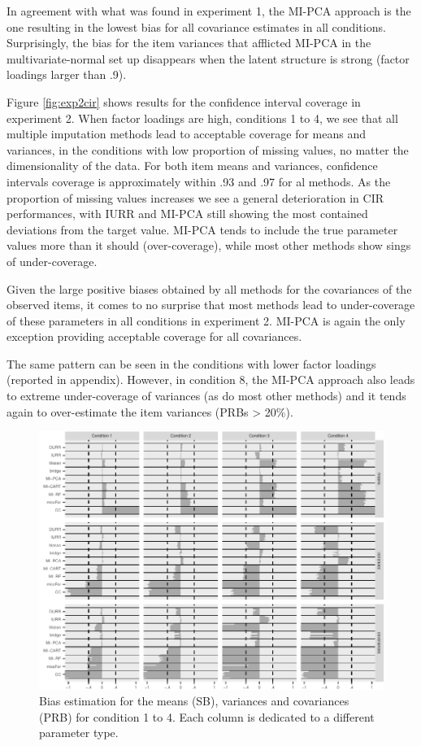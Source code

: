 	In agreement with what was found in experiment 1, the MI-PCA approach is the one resulting in the lowest
	bias for all covariance estimates in all conditions.
	Surprisingly, the bias for the item variances that afflicted MI-PCA in the multivariate-normal
	set up disappears when the latent structure is strong (factor loadings larger than .9).

	Figure \ref{fig:exp2cir} shows results for the confidence interval coverage in experiment 2.
	When factor loadings are high, conditions 1 to 4, we see that all multiple imputation
	methods lead to acceptable coverage for means and variances, in the conditions with low proportion 
	of missing values, no matter the dimensionality of the data.
	For both item means and variances, confidence intervals coverage is approximately within .93 and .97 
	for al methods. 
	As the proportion of missing values increases we see a general deterioration in CIR performances, with IURR
	and MI-PCA still showing the most contained deviations from the target value.
	MI-PCA tends to include the true parameter values more than it should (over-coverage), 
	while most other methods show sings of under-coverage.

	Given the large positive biases obtained by all methods for the covariances of the observed items,
	it comes to no surprise that most methods lead to under-coverage of these parameters in all
	conditions in experiment 2. 
	MI-PCA is again the only exception providing acceptable coverage for all covariances.

	The same pattern can be seen in the conditions with lower factor loadings (reported in appendix). 
	However, in condition 8, the MI-PCA approach also leads to extreme under-coverage of variances 
	(as do most other methods) and it tends again to over-estimate the item variances (PRBs > 20\%).

\begin{figure}
	\includegraphics[width=\textwidth]{../../output/graphs/exp2_semR_bias_sd_14.pdf}
\caption{Bias estimation for the means (SB), variances and covariances (PRB) for condition 1 to 4.
	Each column is dedicated to a different parameter type.}
\label{fig:exp2bias}
\end{figure}


